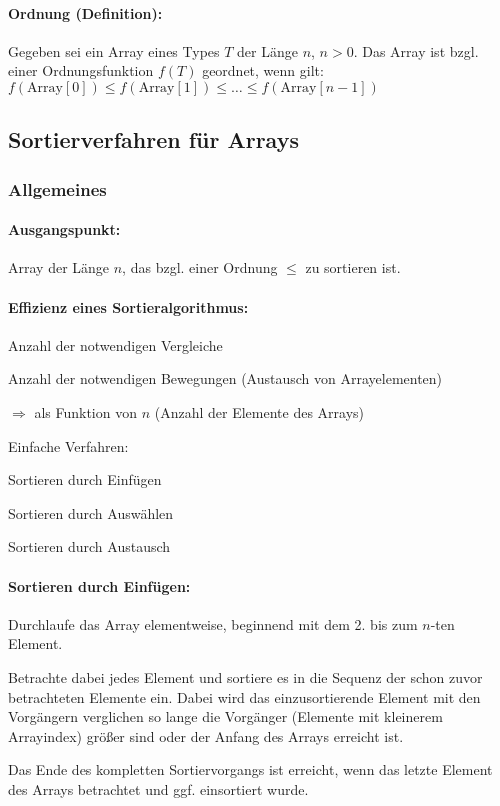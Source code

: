 \paragraph{Ordnung (Definition):} Gegeben sei ein Array eines Types $T$ der Länge $n$, $n>0$. Das Array ist bzgl. einer Ordnungsfunktion $f(T)$ geordnet, wenn gilt:\\
$f(\text{Array}[0]) \le f(\text{Array}[1]) \le \ldots \le f(\text{Array}[n-1])$

\subsection{Sortierverfahren für Arrays}
\subsubsection{Allgemeines}
\paragraph{Ausgangspunkt:} Array der Länge $n$, das bzgl. einer Ordnung $\le$ zu sortieren ist.

\paragraph{Effizienz eines Sortieralgorithmus:}
\begin{compactitem}
	\item Anzahl der notwendigen Vergleiche
	\item Anzahl der notwendigen Bewegungen (Austausch von Arrayelementen)
\end{compactitem}
$\Rightarrow$ als Funktion von $n$ (Anzahl der Elemente des Arrays)

Einfache Verfahren:
\begin{compactitem}
	\item Sortieren durch Einfügen
	\item Sortieren durch Auswählen
	\item Sortieren durch Austausch
\end{compactitem}

\paragraph{Sortieren durch Einfügen:}
\begin{compactitem}
	\item Durchlaufe das Array elementweise, beginnend mit dem 2. bis zum $n$-ten Element.
	\item Betrachte dabei jedes Element und sortiere es in die Sequenz der schon zuvor betrachteten Elemente ein. Dabei wird das einzusortierende Element mit den Vorgängern verglichen so lange die Vorgänger (Elemente mit kleinerem Arrayindex) größer sind oder der Anfang des Arrays erreicht ist.
	\item Das Ende des kompletten Sortiervorgangs ist erreicht, wenn das letzte Element des Arrays betrachtet und ggf. einsortiert wurde.
\end{compactitem}

